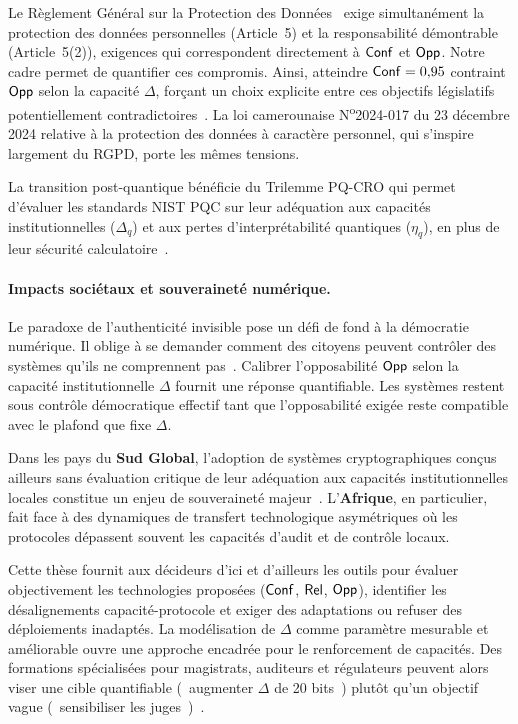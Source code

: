 \begin{sloppypar}
Le R\`eglement G\'en\'eral sur la Protection des Donn\'ees~\cite{GDPR2016,CCPA2018} exige
simultan\'ement la protection des donn\'ees personnelles (Article~5) et la
responsabilit\'e d\'emontrable (Article~5(2)), exigences qui correspondent
directement \`a $\mathsf{Conf}$ et $\mathsf{Opp}$. Notre cadre permet de quantifier ces
compromis. Ainsi, atteindre $\mathsf{Conf} = 0{,}95$ contraint $\mathsf{Opp}$ selon la capacit\'e
$\Delta$, for\c{c}ant un choix explicite entre ces objectifs l\'egislatifs
potentiellement contradictoires~\cite{FinckMoscon19}. La loi camerounaise N\textsuperscript{o}2024-017 du 23 d\'ecembre 2024 relative \`a la protection des donn\'ees \`a caract\`ere personnel, qui s'inspire largement du RGPD, porte les m\^emes tensions.

La transition post-quantique b\'en\'eficie du Trilemme PQ-CRO qui permet
d'\'evaluer les standards NIST PQC sur leur ad\'equation aux capacit\'es
institutionnelles ($\Delta_q$) et aux pertes d'interpr\'etabilit\'e
quantiques ($\eta_q$), en plus de leur s\'ecurit\'e calculatoire~\cite{NISTPQC,Kyber2022,Dilithium2022,SPHINCS2022,Falcon2022}.

\paragraph{Impacts soci\'etaux et souverainet\'e num\'erique.}
\label{par:impact_societal}

Le paradoxe de l'authenticit\'e invisible pose un d\'efi de fond \`a
la d\'emocratie num\'erique. Il oblige \`a se demander comment des citoyens peuvent contr\^oler des
syst\`emes qu'ils ne comprennent pas~\cite{Citron14,Grimmelmann15}. Calibrer l'opposabilit\'e $\mathsf{Opp}$ selon la capacit\'e institutionnelle $\Delta$ fournit une r\'eponse
quantifiable. Les syst\`emes restent sous contr\^ole d\'emocratique
effectif tant que l'opposabilit\'e exig\'ee reste compatible avec le plafond que fixe $\Delta$.

Dans les pays du \textbf{Sud Global}, l'adoption de syst\`emes cryptographiques
con\c{c}us ailleurs sans \'evaluation critique de leur ad\'equation aux capacit\'es
institutionnelles locales constitue un enjeu de souverainet\'e
majeur~\cite{Borija2023Exploring,Agyekum2021Ghana}. L'\textbf{Afrique},
en particulier, fait face \`a des dynamiques de transfert technologique
asym\'etriques o\`u les protocoles d\'epassent souvent les capacit\'es
d'audit et de contr\^ole locaux.

Cette th\`ese fournit aux d\'ecideurs d'ici et d'ailleurs les outils pour
\'evaluer objectivement les technologies propos\'ees ($\mathsf{Conf}$, $\mathsf{Rel}$, $\mathsf{Opp}$),
identifier les d\'esalignements capacit\'e-protocole et exiger des
adaptations ou refuser des d\'eploiements inadapt\'es. La mod\'elisation de
 $\Delta$ comme param\`etre mesurable et am\'eliorable ouvre une approche
encadr\'ee pour le renforcement de capacit\'es. Des formations sp\'ecialis\'ees
pour magistrats, auditeurs et r\'egulateurs peuvent alors viser une cible quantifiable
(\guillemotleft~augmenter $\Delta$ de 20 bits~\guillemotright) plut\^ot qu'un objectif vague
(\guillemotleft~sensibiliser les juges~\guillemotright)~\cite{Argyris1978}.
\end{sloppypar}

